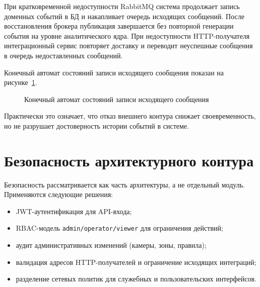 При кратковременной недоступности RabbitMQ система продолжает запись доменных событий в БД и накапливает очередь исходящих сообщений. После восстановления брокера публикация завершается без повторной генерации события на уровне аналитического ядра. При недоступности HTTP-получателя интеграционный сервис повторяет доставку и переводит неуспешные сообщения в очередь недоставленных сообщений.

Конечный автомат состояний записи исходящего сообщения показан на рисунке~\ref{fig:short_outbox_fsm}.

\begin{figure}[H]
\centering
{}
\caption{Конечный автомат состояний записи исходящего сообщения}
\label{fig:short_outbox_fsm}
\end{figure}

Практически это означает, что отказ внешнего контура снижает своевременность, но не разрушает достоверность истории событий в системе.

\section{Безопасность архитектурного контура}

Безопасность рассматривается как часть архитектуры, а не отдельный модуль. Применяются следующие решения:
\begin{itemize}
    \item JWT-аутентификация для API-входа;
    \item RBAC-модель \texttt{admin/operator/viewer} для ограничения действий;
    \item аудит административных изменений (камеры, зоны, правила);
    \item валидация адресов HTTP-получателей и ограничение исходящих интеграций;
    \item разделение сетевых политик для служебных и пользовательских интерфейсов.
\end{itemize}

